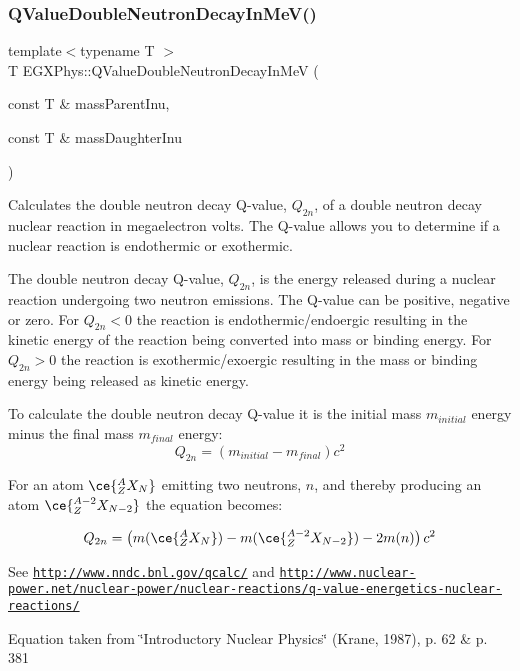 \subsubsection{\texorpdfstring{Q\+Value\+Double\+Neutron\+Decay\+In\+Me\+V()}{QValueDoubleNeutronDecayInMeV()}}
{\footnotesize\ttfamily template$<$typename T $>$ \\
T E\+G\+X\+Phys\+::\+Q\+Value\+Double\+Neutron\+Decay\+In\+MeV (\begin{DoxyParamCaption}\item[{const T \&}]{mass\+Parent\+Inu,  }\item[{const T \&}]{mass\+Daughter\+Inu }\end{DoxyParamCaption})}



Calculates the double neutron decay Q-\/value, $Q_{2n}$, of a double neutron decay nuclear reaction in megaelectron volts. The Q-\/value allows you to determine if a nuclear reaction is endothermic or exothermic. 

The double neutron decay Q-\/value, $Q_{2n}$, is the energy released during a nuclear reaction undergoing two neutron emissions. The Q-\/value can be positive, negative or zero. For $Q_{2n} < 0$ the reaction is endothermic/endoergic resulting in the kinetic energy of the reaction being converted into mass or binding energy. For $Q_{2n} > 0$ the reaction is exothermic/exoergic resulting in the mass or binding energy being released as kinetic energy.

To calculate the double neutron decay Q-\/value it is the initial mass $m_{initial}$ energy minus the final mass $m_{final}$ energy\+: \[Q_{2n} = \left ( m_{initial}-m_{final}\right ) c^2\]

For an atom $\ce{ ^{A}_{Z}X_{N} }$ emitting two neutrons, $n$, and thereby producing an atom $\ce{ ^{A-2}_{Z}X_{N-2} }$ the equation becomes\+:

\[Q_{2n} = \left ( m(\ce{ ^{A}_{Z}X_{N} }) - m(\ce{ ^{A-2}_{Z}X_{N-2} }) - 2m(n) \right ) c^2\]

See \href{http://www.nndc.bnl.gov/qcalc/}{\tt http\+://www.\+nndc.\+bnl.\+gov/qcalc/} and \href{http://www.nuclear-power.net/nuclear-power/nuclear-reactions/q-value-energetics-nuclear-reactions/}{\tt http\+://www.\+nuclear-\/power.\+net/nuclear-\/power/nuclear-\/reactions/q-\/value-\/energetics-\/nuclear-\/reactions/}

Equation taken from \char`\"{}\+Introductory Nuclear Physics\char`\"{} (Krane, 1987), p. 62 \& p. 381


